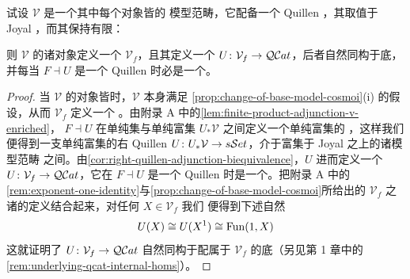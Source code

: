 \begin{corollary}\label{cor:cartesian-closed-cosmos}
试设 $\mathcal{V}$ 是一个其中每个\trFibrant{}对象皆\trCofibrant{}的\trCartesianClosed{}%
模型范畴，它配备一个 Quillen \trAdjunction，其\trRightAdjoint{}取值于 Joyal
\trModelStructure{}，而其\trLeftAdjoint{}保持有限\trProduct{}：
\begin{center}
\end{center}
则 $\mathcal{V}$ 的诸\trFibrant{}对象定义一个\trCartesianClosed{}\trInfinityCosmos{}
$\mathcal{V}_{f}$，且其\trRightAdjoint{}定义一个\trCosmologicalFunctor{}
$U\colon\mathcal{V}_{f}\to\mathcal{Q}\mathcal{C}at$，后者自然同构于底\trQuasiCategory\trFunctor，并每当
$F\dashv U$ 是一个 Quillen \trEquivalence{}时必是一个\trCosmologicalBiequivalence。
\end{corollary}
\begin{proof}
当 $\mathcal{V}$ 的\trFibrant{}对象皆\trCofibrant{}时，$\mathcal{V}$ 本身满足%
\cref{prop:change-of-base-model-cosmoi}(i) 的假设，从而 $\mathcal{V}_{f}$ 定义一个%
\trInfinityCosmos。由附录 A 中的\cref{lem:finite-product-adjunction-v-enriched}，
$F\dashv U$ 在单纯集与单纯富集\trCategory{} $U_{*}\mathcal{V}$ 之间定义一个单纯富集的%
\trAdjunction，这样我们便得到一支单纯富集的右 Quillen \trFunctor{}
$U\colon U_{*}\mathcal{V}\to s\mathcal{S}et$，介于富集于 Joyal \trModelStructure{}之上的诸模型范畴
之间。由\cref{cor:right-quillen-adjunction-biequivalence}，$U$ 进而定义一个%
\trCosmologicalFunctor{} $U\colon\mathcal{V}_{f}\to\mathcal{Q}\mathcal{C}at$，它在 $F\dashv U$ 是一个
Quillen \trEquivalence{}时是一个\trBiequivalence。把附录 A 中的%
\cref{rem:exponent-one-identity}与\cref{prop:change-of-base-model-cosmoi}所给出的
$\mathcal{V}_{f}$ 之诸\trFunctorSpace{}的定义结合起来，对任何 $X\in\mathcal{V}_{f}$ 我们
便得到下述自然\trIsomorphism
\[
U(X)\cong U(X^{1})\cong\operatorname{Fun}(1,X)
\]
这就证明了\trCosmologicalFunctor{} $U\colon\mathcal{V}_{f}\to\mathcal{Q}\mathcal{C}at$ 自然同构于配属于%
\trInfinityCosmos{} $\mathcal{V}_{f}$ 的底\trQuasiCategory\trFunctor（另见第 1 章中的%
\cref{rem:underlying-qcat-internal-homs}）。
\end{proof}

